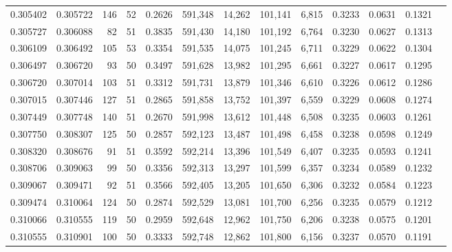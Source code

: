 \begin{tabular}{rrrrrrrrrrrrr}
0.305402 & 0.305722 &   146 &  52 &                                     0.2626 & 591,348 &  14,262 & 101,141 &   6,815 & 0.3233 & 0.0631 & 0.1321 \\
0.305727 & 0.306088 &    82 &  51 &                                     0.3835 & 591,430 &  14,180 & 101,192 &   6,764 & 0.3230 & 0.0627 & 0.1313 \\
0.306109 & 0.306492 &   105 &  53 &                                     0.3354 & 591,535 &  14,075 & 101,245 &   6,711 & 0.3229 & 0.0622 & 0.1304 \\
0.306497 & 0.306720 &    93 &  50 &                                     0.3497 & 591,628 &  13,982 & 101,295 &   6,661 & 0.3227 & 0.0617 & 0.1295 \\
0.306720 & 0.307014 &   103 &  51 &                                     0.3312 & 591,731 &  13,879 & 101,346 &   6,610 & 0.3226 & 0.0612 & 0.1286 \\
0.307015 & 0.307446 &   127 &  51 &                                     0.2865 & 591,858 &  13,752 & 101,397 &   6,559 & 0.3229 & 0.0608 & 0.1274 \\
0.307449 & 0.307748 &   140 &  51 &                                     0.2670 & 591,998 &  13,612 & 101,448 &   6,508 & 0.3235 & 0.0603 & 0.1261 \\
0.307750 & 0.308307 &   125 &  50 &                                     0.2857 & 592,123 &  13,487 & 101,498 &   6,458 & 0.3238 & 0.0598 & 0.1249 \\
0.308320 & 0.308676 &    91 &  51 &                                     0.3592 & 592,214 &  13,396 & 101,549 &   6,407 & 0.3235 & 0.0593 & 0.1241 \\
0.308706 & 0.309063 &    99 &  50 &                                     0.3356 & 592,313 &  13,297 & 101,599 &   6,357 & 0.3234 & 0.0589 & 0.1232 \\
0.309067 & 0.309471 &    92 &  51 &                                     0.3566 & 592,405 &  13,205 & 101,650 &   6,306 & 0.3232 & 0.0584 & 0.1223 \\
0.309474 & 0.310064 &   124 &  50 &                                     0.2874 & 592,529 &  13,081 & 101,700 &   6,256 & 0.3235 & 0.0579 & 0.1212 \\
0.310066 & 0.310555 &   119 &  50 &                                     0.2959 & 592,648 &  12,962 & 101,750 &   6,206 & 0.3238 & 0.0575 & 0.1201 \\
0.310555 & 0.310901 &   100 &  50 &                                     0.3333 & 592,748 &  12,862 & 101,800 &   6,156 & 0.3237 & 0.0570 & 0.1191 \\

\end{tabular}

